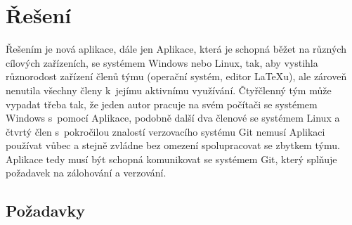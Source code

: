 \chapter{Řešení}
Řešením je nová aplikace, dále jen Aplikace, která je schopná běžet na různých cílových zařízeních, se systémem Windows nebo Linux, tak, aby vystihla různorodost zařízení členů týmu (operační systém, editor LaTeXu), ale zároveň nenutila všechny členy k~jejímu aktivnímu využívání. Čtyřčlenný tým může vypadat třeba tak, že jeden autor pracuje na svém počítači se systémem Windows s~pomocí Aplikace, podobně další dva členové se systémem Linux a čtvrtý člen s~pokročilou znalostí verzovacího systému Git nemusí Aplikaci používat vůbec a stejně zvládne bez omezení spolupracovat se zbytkem týmu. Aplikace tedy musí být schopná komunikovat se systémem Git, který splňuje požadavek na zálohování a verzování.

\section{Požadavky}

